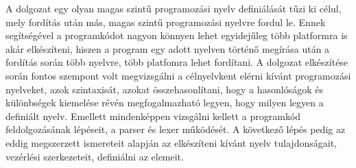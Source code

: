 
A dolgozat egy olyan magas szintű programozási nyelv definiálását tűzi ki célul, mely fordítás után más, magas szintű programozási nyelvre fordul le. Ennek segítségével a programkódot nagyon könnyen lehet egyidejűleg több platformra is akár elkészíteni, hiszen a program egy adott nyelven történő megírása után a fordítás során több nyelvre, több platfomra lehet fordítani.
A dolgozat elkészítése során fontos szempont volt megvizsgálni a célnyelvkent elérni kívánt programozási nyelveket, azok szintaxisát, azokat összehasonlítani, hogy a hasonlóságok és különbségek kiemelése révén megfogalmazható legyen, hogy milyen legyen a definiált nyelv.
Emellett mindenképpen vizsgálni kellett a programkód feldolgozásának lépéseit, a parser és lexer működését. A következő lépés pedig az eddig megszerzett ismereteit alapján az elkészíteni kívánt nyelv tulajdonságait, vezérlési szerkezeteit, definiálni az elemeit.